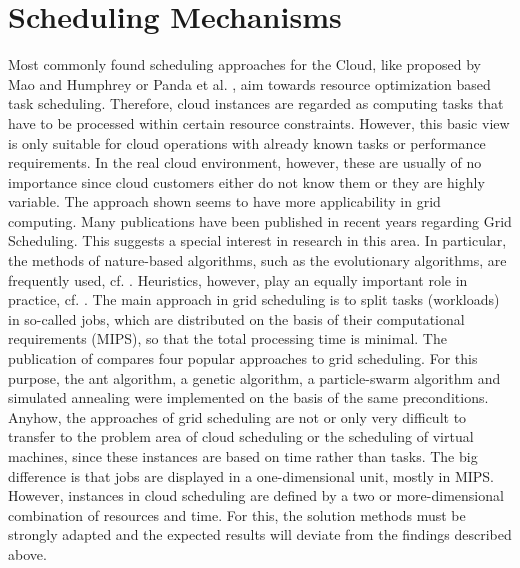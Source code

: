 \section{Scheduling Mechanisms}
Most commonly found scheduling approaches for the Cloud, like proposed by Mao and Humphrey \cite{6114435} or Panda et al. \cite{PANDA2015176}, aim towards resource optimization based task scheduling. Therefore, cloud instances are regarded as computing tasks that have to be processed within certain resource constraints. However, this basic view is only suitable for cloud operations with already known tasks or performance requirements. In the real cloud environment, however, these are usually of no importance since cloud customers either do not know them or they are highly variable. The approach shown seems to have more applicability in grid computing. Many publications have been published in recent years regarding Grid Scheduling. This suggests a special interest in research in this area. In particular, the methods of nature-based algorithms, such as the evolutionary algorithms, are frequently used, cf. \cite{tlda} \cite{Ga-grid-2}. Heuristics, however, play an equally important role in practice, cf. \cite{riskheuristik}. The main approach in grid scheduling is to split tasks (workloads) in so-called jobs, which are distributed on the basis of their computational requirements (MIPS), so that the total processing time is minimal. The publication of \cite{4heurisitken} compares four popular approaches to grid scheduling. For this purpose, the ant algorithm, a genetic algorithm, a particle-swarm algorithm and simulated annealing were implemented on the basis of the same preconditions. Anyhow, the approaches of grid scheduling are not or only very difficult to transfer to the problem area of cloud scheduling or the scheduling of virtual machines, since these instances are based on time rather than tasks. The big difference is that jobs are displayed in a one-dimensional unit, mostly in MIPS. However, instances in cloud scheduling are defined by a two or more-dimensional combination of resources and time. For this, the solution methods must be strongly adapted and the expected results will deviate from the findings described above.

